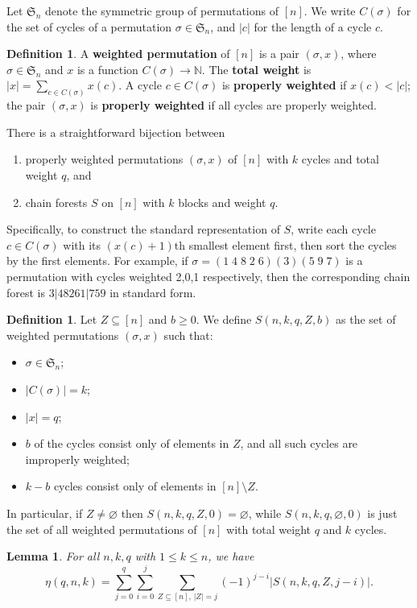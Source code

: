 \documentclass[11pt]{amsart}
\newtheorem{lemma}[theorem]{Lemma}
\theoremstyle{definition}
\newtheorem{definition}[theorem]{Definition}
\renewcommand{\emptyset}{\varnothing}
\newcommand{\0}{\emptyset}
\newcommand{\N}{\mathbb{N}}
\newcommand{\sm}{\setminus}
\newcommand{\defterm}[1]{\textbf{#1}}
\newcommand{\Sym}{\mathfrak{S}}
\begin{document}
Let $\Sym_n$ denote the symmetric group of permutations of $[n]$.
We write $C(\sigma)$ for the set of cycles of a permutation $\sigma\in\Sym_n$, and $|c|$ for the length of a cycle $c$.

\begin{definition}
A \defterm{weighted permutation} of $[n]$ is a pair $(\sigma,x)$, where $\sigma\in\Sym_n$ and $x$ is a function $C(\sigma)\to\N$.
The \defterm{total weight} is $|x|=\sum_{c\in C(\sigma)}x(c)$.
A cycle $c\in C(\sigma)$ is \defterm{properly weighted} if $x(c)<|c|$; the pair $(\sigma,x)$ is \defterm{properly weighted} if all cycles are properly weighted.
\end{definition}

There is a straightforward bijection between
\begin{enumerate}
\item[(i)] properly weighted permutations $(\sigma,x)$ of $[n]$ with $k$ cycles and total weight $q$, and
\item[(ii)] chain forests $S$ on $[n]$ with $k$ blocks and weight $q$.
\end{enumerate}
Specifically, to construct the standard representation of $S$, write each cycle $c\in C(\sigma)$ with its $(x(c)+1)$th smallest element first, then sort the cycles by the first elements.
For example, if $\sigma=(1\;4\;8\;2\;6)(3)(5\;9\;7)$ is a permutation with cycles weighted 2,0,1 respectively, then the corresponding chain forest is $3|48261|759$ in standard form.

\begin{definition}
Let $Z\subseteq [n]$ and $b\geq 0$.
We define $S(n,k,q,Z,b)$ as the set of weighted permutations $(\sigma,x)$ such that:
\begin{itemize}
\item $\sigma\in\Sym_n$;
\item $|C(\sigma)|=k$;
\item $|x|=q$;
\item $b$ of the cycles consist only of elements in $Z$, and all such cycles are improperly weighted;
\item $k-b$ cycles consist only of elements in $[n]\sm Z$.
\end{itemize}
In particular, if $Z\neq\0$ then $S(n,k,q,Z,0)=\emptyset$, while $S(n,k,q,\0,0)$ is just the set of all weighted permutations of $[n]$ with total weight $q$ and $k$ cycles.
\end{definition}

\begin{lemma}\label{final lah form}
For all $n,k,q$ with $1\leq k\leq n$, we have
\[
\eta(q,n,k)=\sum_{j=0}^q\sum_{i=0}^j\sum_{Z\subseteq [n],\, |Z|=j}(-1)^{j-i}|S(n,k,q,Z,j-i)|.
\]
\end{lemma}
\end{document}
